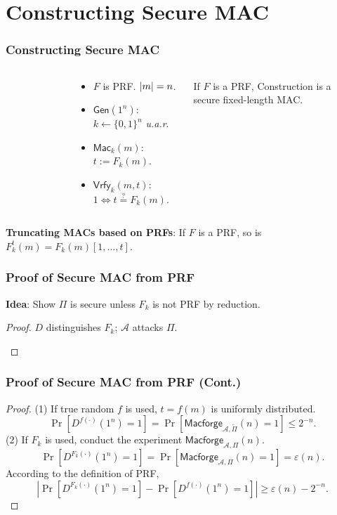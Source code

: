 \section{Constructing Secure MAC}
\begin{frame}\frametitle{Constructing Secure MAC}
\begin{columns}[c]
\begin{figure}
\begin{center}

\end{center}
\end{figure}
\begin{construction}
\begin{itemize}
\item $F$ is PRF. $\lvert m\rvert = n$.
\item $\mathsf{Gen}(1^n)$: $k \gets \{0,1\}^n$ \emph{u.a.r}.
\item $\mathsf{Mac}_k(m)$: $t := F_k(m)$.
\item $\mathsf{Vrfy}_k(m,t)$: $1 \iff t \overset{?}{=} F_k(m)$.
\end{itemize}
\end{construction}
\begin{theorem}\label{thm:mac}
If $F$ is a PRF, Construction is a secure fixed-length MAC.
\end{theorem}
\end{columns}
\begin{lemma}
\textbf{Truncating MACs based on PRFs}:
If $F$ is a PRF, so is $F^t_k(m) = F_k(m)[1,\dots,t]$.
\end{lemma}
\end{frame}
\begin{frame}\frametitle{Proof of Secure MAC from PRF}
\textbf{Idea}: Show $\Pi$ is secure unless $F_k$ is not PRF by reduction.  
\begin{proof}
$D$ distinguishes $F_k$; $\mathcal{A}$ attacks $\Pi$. 
\begin{figure}
\begin{center}

\end{center}
\end{figure}
\end{proof}
\end{frame}
\begin{frame}\frametitle{Proof of Secure MAC from PRF (Cont.)}
\begin{proof}
(1) If true random $f$ is used, $t=f(m)$ is uniformly distributed.
\[ \Pr[D^{f(\cdot)}(1^n)=1] = \Pr[\mathsf{Macforge}_{\mathcal{A},\tilde{\Pi}}(n) = 1] \le 2^{-n}.\]
(2) If $F_k$ is used, conduct the experiment $\mathsf{Macforge}_{\mathcal{A},\Pi}(n)$. 
\[ \Pr[D^{F_k(\cdot)}(1^n)=1] = \Pr[\mathsf{Macforge}_{\mathcal{A},\Pi}(n) = 1] = \varepsilon(n).\]
According to the definition of PRF,
\[ \left| \Pr[D^{F_k(\cdot)}(1^n)=1] - \Pr[D^{f(\cdot)}(1^n)=1] \right| \ge \varepsilon(n) - 2^{-n}. \]
\end{proof}
\end{frame}
